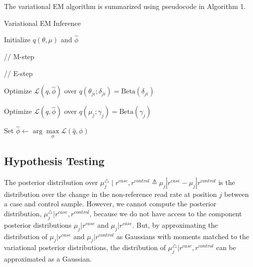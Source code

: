 \documentclass{bmcart}
\begin{document}
The variational EM algorithm is summarized using pseudocode in Algorithm 1.
\begin{algorithm}[ht]
  \caption{Variational EM Inference}

  \begin{algorithmic}[1]

  \State Initialize $q(\theta, \mu)$ and $\hat{\phi}$

  \State // M-step

  \Repeat

    \State // E-step

	\Repeat

			\State Optimize $\mathcal{L}(q, \hat{\phi})$ over $q(\theta_{ji}; \delta_{ji}) = \text{Beta} (\delta_{ji})$
			\EndFor
		\EndFor

            \State Optimize $\mathcal{L}(q, \hat{\phi})$ over $q(\mu_j; \gamma_j) = \text{Beta} (\gamma_j)$
        \EndFor


    \State Set $\hat{\phi} \leftarrow \arg \max\limits_{\phi}
            \mathcal{L}(\hat{q},\phi)$

  \end{algorithmic}

\end{algorithm}



\subsection{Hypothesis Testing}
The posterior distribution over $\mu_j^{\triangle} \mid r^{case}, r^{control} \triangleq \mu_j|r^{case} - \mu_j|r^{control}$ is the distribution over the change in the non-reference read rate at position $j$ between a case and control sample.
However, we cannot compute the posterior distribution, $\mu_j^{\triangle} | r^{case}, r^{control}$, because we do not have access to the component posterior distributions $\mu_j|r^{case}$ and $\mu_j|r^{case}$.
But, by approximating the distribution of $\mu_j|r^{case}$ and $\mu_j|r^{control}$ as Gaussians with moments matched to the variational posterior distributions, the distribution of $\mu_j^{\triangle} | r^{case}, r^{control}$ can be approximated as a Gaussian.
\end{document}

